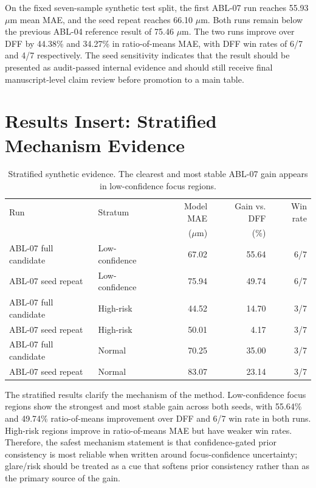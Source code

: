 \documentclass[11pt,a4paper]{article}
\newcommand{\um}{\ensuremath{\mu\mathrm{m}}}
\begin{document}
On the fixed seven-sample synthetic test split, the first ABL-07 run reaches 55.93 \um{} mean MAE, and the seed repeat reaches 66.10 \um{}. Both runs remain below the previous ABL-04 reference result of 75.46 \um{}. The two runs improve over DFF by 44.38\% and 34.27\% in ratio-of-means MAE, with DFF win rates of 6/7 and 4/7 respectively. The seed sensitivity indicates that the result should be presented as audit-passed internal evidence and should still receive final manuscript-level claim review before promotion to a main table.

\section*{Results Insert: Stratified Mechanism Evidence}

\begin{table}[h]
  \centering
  \caption{Stratified synthetic evidence. The clearest and most stable ABL-07 gain appears in low-confidence focus regions.}
  \label{tab:cgp_strata}
  \small
  \begin{tabular}{llrrr}
    \toprule
    Run & Stratum & Model MAE & Gain vs. DFF & Win rate \\
    & & (\um{}) & (\%) & \\
    \midrule
    ABL-07 full candidate & Low-confidence & 67.02 & 55.64 & 6/7 \\
    ABL-07 seed repeat & Low-confidence & 75.94 & 49.74 & 6/7 \\
    ABL-07 full candidate & High-risk & 44.52 & 14.70 & 3/7 \\
    ABL-07 seed repeat & High-risk & 50.01 & 4.17 & 3/7 \\
    ABL-07 full candidate & Normal & 70.25 & 35.00 & 3/7 \\
    ABL-07 seed repeat & Normal & 83.07 & 23.14 & 3/7 \\
    \bottomrule
  \end{tabular}
\end{table}

The stratified results clarify the mechanism of the method. Low-confidence focus regions show the strongest and most stable gain across both seeds, with 55.64\% and 49.74\% ratio-of-means improvement over DFF and 6/7 win rate in both runs. High-risk regions improve in ratio-of-means MAE but have weaker win rates. Therefore, the safest mechanism statement is that confidence-gated prior consistency is most reliable when written around focus-confidence uncertainty; glare/risk should be treated as a cue that softens prior consistency rather than as the primary source of the gain.
\end{document}
